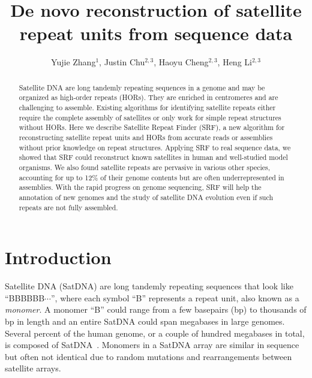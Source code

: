 \documentclass{bioinfo}
\newcommand{\revised}[1]{{\color{blue}#1}}
\begin{document}

\title[Satellite repeat finder]{De novo reconstruction of satellite repeat units from sequence data}
\author[Li]{Yujie Zhang$^1$, Justin Chu$^{2,3}$, Haoyu Cheng$^{2,3}$, Heng Li$^{2,3}$}
\address{$^1$Harvard School of Public Health, 677 Huntington Avenue, Boston, MA 02115, USA,
$^2$Department of Data Science, Dana-Farber Cancer Institute, 450 Brookline Ave, Boston, MA 02215, USA,
$^3$Department of Biomedical Informatics, Harvard Medical School, 10 Shattuck St, Boston, MA 02115, USA}

\maketitle

\begin{abstract}
Satellite DNA are long tandemly repeating sequences in a genome and may be organized as
high-order repeats (HORs). They are enriched in centromeres and are
challenging to assemble. Existing algorithms for identifying satellite repeats
either require the complete assembly of satellites or only work for simple
repeat structures without HORs. Here we describe Satellite Repeat Finder (SRF), a new
algorithm for reconstructing satellite repeat units and HORs from
accurate reads or assemblies without prior knowledge on repeat structures.
Applying SRF to real sequence data, we showed that SRF could reconstruct known
satellites in human and well-studied model organisms. We also found satellite
repeats are pervasive in various other species, accounting for up to 12\% of
their genome contents but are often underrepresented in assemblies. With the
rapid progress on genome sequencing, SRF will help the annotation of new
genomes and the study of satellite DNA evolution even if such repeats are not
fully assembled.
\end{abstract}

\section{Introduction}

Satellite DNA (SatDNA) are long tandemly repeating sequences that look like
``{\sf BBBBBB$\cdots$}'', where each symbol ``{\sf B}'' represents a
repeat unit, also known as a \emph{monomer}. A monomer ``{\sf B}'' could range
from a few basepairs (bp) to thousands of bp in length and an entire SatDNA could span
megabases in large genomes. Several percent of the human genome, or a couple of
hundred megabases in total, is composed of SatDNA~\citep{Altemose:2022tv}.
Monomers in a SatDNA array are similar in sequence but often not identical due
to random mutations \revised{and rearrangements between satellite arrays}.
\end{document}

